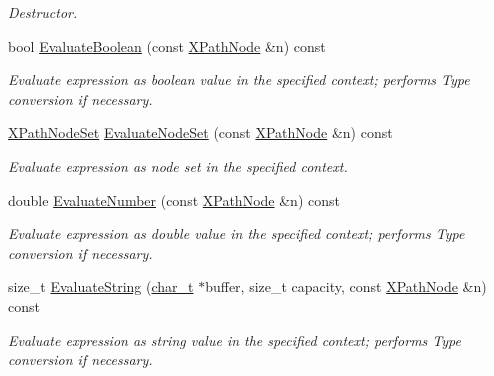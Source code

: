 \begin{DoxyCompactItemize}
\begin{DoxyCompactList}\small\item\em Destructor. \item\end{DoxyCompactList}\item 
bool \hyperlink{classMezzanine_1_1xml_1_1XPathQuery_a3bcbef02da73108550e940ee3de50267}{EvaluateBoolean} (const \hyperlink{classMezzanine_1_1xml_1_1XPathNode}{XPathNode} \&n) const 
\begin{DoxyCompactList}\small\item\em Evaluate expression as boolean value in the specified context; performs Type conversion if necessary. \item\end{DoxyCompactList}\item 
\hyperlink{classMezzanine_1_1xml_1_1XPathNodeSet}{XPathNodeSet} \hyperlink{classMezzanine_1_1xml_1_1XPathQuery_a72f528bd04dce854e13e5b0c593b8980}{EvaluateNodeSet} (const \hyperlink{classMezzanine_1_1xml_1_1XPathNode}{XPathNode} \&n) const 
\begin{DoxyCompactList}\small\item\em Evaluate expression as node set in the specified context. \item\end{DoxyCompactList}\item 
double \hyperlink{classMezzanine_1_1xml_1_1XPathQuery_a716de15af35a38cb5a4a661ab25b852f}{EvaluateNumber} (const \hyperlink{classMezzanine_1_1xml_1_1XPathNode}{XPathNode} \&n) const 
\begin{DoxyCompactList}\small\item\em Evaluate expression as double value in the specified context; performs Type conversion if necessary. \item\end{DoxyCompactList}\item 
size\_\-t \hyperlink{classMezzanine_1_1xml_1_1XPathQuery_a58a1c02f20e24c543b2c820ef8bd038a}{EvaluateString} (\hyperlink{namespaceMezzanine_1_1xml_a29b8a47c179e9895c4e9e66c45d1dbbc}{char\_\-t} $\ast$buffer, size\_\-t capacity, const \hyperlink{classMezzanine_1_1xml_1_1XPathNode}{XPathNode} \&n) const 
\begin{DoxyCompactList}\small\item\em Evaluate expression as string value in the specified context; performs Type conversion if necessary. \item\end{DoxyCompactList}\item 

\end{DoxyCompactItemize}
